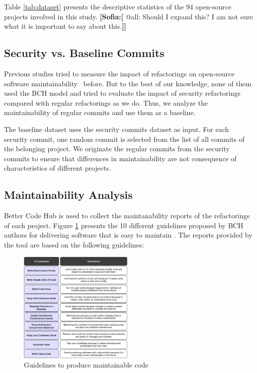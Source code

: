 \documentclass[10pt,conference]{IEEEtran}
\newcommand{\Sof}[1]{\textbf{[Sofia:[}{\color{red} #1}\textbf{]]}}
\begin{document}
Table \ref{tab:dataset} presents the descriptive statistics of the 94 open-source projects involved in this study. \Sof{@all: Should I expand this? I am not sure what it is important to say about this.}

\subsection{Security vs. Baseline Commits}

Previous studies tried to measure the impact of refactorings on open-source software maintainability~\cite{HEGEDUS2018313} before. But to the best of our knowledge, none of them used the BCH model and tried to evaluate the impact of security refactorings compared with regular refactorings as we do. Thus, we analyze the maintainability of regular commits and use them as a baseline.

The baseline dataset uses the security commits dataset as input. For each
security commit, one random commit is selected from the list of all commits of
the belonging project. We originate the regular commits from the security
commits to ensure that differences in maintainability are not consequence of
characteristics of different projects.

\subsection{Maintainability Analysis}

Better Code Hub is used to collect the maintanability reports of the refactorings of each project. Figure \ref{fig:guidelines} presents the 10 different guidelines proposed by BCH authors for delivering software that is easy to maintain \cite{Visser:2016:OREILLY}. The reports provided by the tool are based on the following guidelines:

\begin{figure}[H]
 	\centering 	\includegraphics[width=0.49\textwidth]{figures/guidelines.pdf}
 	\caption{Guidelines to produce maintainable code}
	\label{fig:guidelines}
\end{figure}
\end{document}

